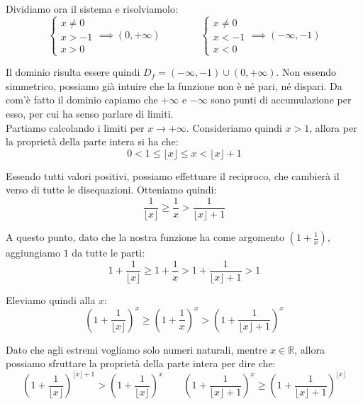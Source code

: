 \documentclass{article}
\begin{document}
\noindent Dividiamo ora il sistema e risolviamolo:
\begin{equation*}
    \begin{cases}
        x \neq 0 \\
        x > -1 \\
        x > 0
    \end{cases}
    \implies (0, +\infty) \qquad \qquad
    \begin{cases}
        x \neq 0 \\
        x < -1 \\
        x < 0
    \end{cases}
    \implies (-\infty, -1)
\end{equation*}

\noindent Il dominio risulta essere quindi $D_f = (-\infty, -1) \cup (0, +\infty)$. Non essendo simmetrico, possiamo già intuire che la funzione non è né pari, né dispari. Da com'è fatto il dominio capiamo che $+\infty$ e $-\infty$ sono punti di accumulazione per esso, per cui ha senso parlare di limiti.\\
Partiamo calcolando i limiti per $x \to +\infty$. Consideriamo quindi $x > 1$, allora per la proprietà della parte intera si ha che:
\begin{equation*}
    0 < 1 \leq \lfloor x \rfloor \leq x < \lfloor x \rfloor + 1
\end{equation*}

\noindent Essendo tutti valori positivi, possiamo effettuare il reciproco, che cambierà il verso di tutte le disequazioni. Otteniamo quindi:
\begin{equation*}
    \frac{1}{\lfloor x \rfloor} \geq \frac{1}{x} > \frac{1}{\lfloor x \rfloor + 1}
\end{equation*}

\noindent A questo punto, dato che la nostra funzione ha come argomento $(1 + \frac{1}{x})$, aggiungiamo $1$ da tutte le parti:
\begin{equation*}
      1 + \frac{1}{\lfloor x \rfloor} \geq 1 + \frac{1}{x} > 1 + \frac{1}{\lfloor x \rfloor + 1} > 1
\end{equation*}

\noindent Eleviamo quindi alla $x$:
\begin{equation*}
      \left(1 + \frac{1}{\lfloor x \rfloor}\right)^x \geq \left(1 + \frac{1}{x}\right)^x > \left(1 + \frac{1}{\lfloor x \rfloor + 1}\right)^x
\end{equation*}

\noindent Dato che agli estremi vogliamo solo numeri naturali, mentre $x \in \mathbb{R}$, allora possiamo sfruttare la proprietà della parte intera per dire che:
\begin{equation*}
     \left(1 + \frac{1}{\lfloor x \rfloor}\right)^{\lfloor x \rfloor + 1} > \left(1 + \frac{1}{\lfloor x \rfloor}\right)^x \qquad \left(1 + \frac{1}{\lfloor x \rfloor + 1}\right)^x \geq \left(1 + \frac{1}{\lfloor x \rfloor + 1}\right)^{\lfloor x \rfloor}
\end{equation*}
\end{document}
